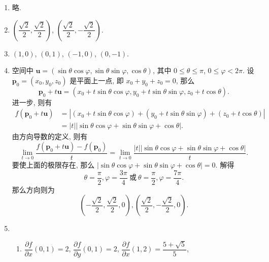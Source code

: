 % 
\begin{enumerate}
    \item %
        略.
    \item %
        $\left(\dfrac{\sqrt{2}}{2}, \dfrac{\sqrt{2}}{2}\right)$,
        $\left(\dfrac{\sqrt{2}}{2}, -\dfrac{\sqrt{2}}{2}\right)$.
    \item %
        $(1,0)$, $(0,1)$, $(-1,0)$, $(0,-1)$.
    \item %
        空间中 $\boldsymbol{u} = (\sin\theta\cos\varphi, \sin\theta\sin\varphi, \cos\theta)$, 其中 $0 \leqslant \theta \leqslant \pi$, $0 \leqslant \varphi < 2\pi$.
        设 $\boldsymbol{p}_0 = (x_0, y_0, z_0)$ 是平面上一点, 即 $x_0 + y_0 + z_0 = 0$, 那么
        \[
            \boldsymbol{p}_0 + t\boldsymbol{u} = (x_0 + t\sin\theta\cos\varphi, y_0 + t\sin\theta\sin\varphi, z_0 + t\cos\theta).    
        \]
        进一步, 则有
        \begin{align*}
            f(\boldsymbol{p}_0 + t\boldsymbol{u}) &= |(x_0 + t\sin\theta\cos\varphi) + (y_0 + t\sin\theta\sin\varphi) + (z_0 + t\cos\theta)| \\
            &= |t||\sin\theta\cos\varphi + \sin\theta\sin\varphi + \cos\theta|.    
        \end{align*}
        由方向导数的定义, 则有
        \[
            \lim_{t\to0}\frac{f(\boldsymbol{p}_0 + t\boldsymbol{u}) - f(\boldsymbol{p}_0)}{t}
            =
            \lim_{t\to0}\frac{|t||\sin\theta\cos\varphi + \sin\theta\sin\varphi + \cos\theta|}{t}.    
        \]
        要使上面的极限存在, 那么 $|\sin\theta\cos\varphi + \sin\theta\sin\varphi + \cos\theta| = 0$. 解得
        \[
            \theta = \frac{\pi}{2}, \varphi = \frac{3\pi}{4}\ \text{或}\ \theta = \frac{\pi}{2}, \varphi = \frac{7\pi}{4}.    
        \]
        那么方向则为
        \[
            \left(-\frac{\sqrt{2}}{2}, \frac{\sqrt{2}}{2}, 0\right), \left(\frac{\sqrt{2}}{2}, -\frac{\sqrt{2}}{2}, 0\right).    
        \]
    \item %
        \begin{enumerate}[(1)]
            \item %
                $\dfrac{\partial{f}}{\partial{x}}(0,1) = 2$,
                $\dfrac{\partial{f}}{\partial{y}}(0,1) = 2$,
                $\dfrac{\partial{f}}{\partial{x}}(1,2) = \dfrac{5 + \sqrt{5}}{5}$,

\end{enumerate}
\end{enumerate}
